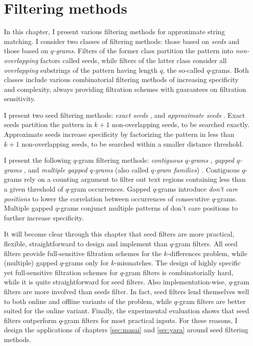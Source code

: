 \chapter{Filtering methods}
\label{sec:filter}

In this chapter, I present various filtering methods for approximate string matching.
I consider two classes of filtering methods: those based on \emph{seeds} and those based on \emph{$q$-grams}.
Filters of the former class partition the pattern into \emph{non-overlapping} factors called seeds, while filters of the latter class consider all \emph{overlapping} substrings of the pattern having length $q$, the so-called $q$-grams.
Both classes include various combinatorial filtering methods of increasing specificity and complexity, always providing filtration schemes with guarantees on filtration sensitivity.

I present two seed filtering methods:
\emph{exact seeds} \citep{Baeza1992}, and
\emph{approximate seeds} \citep{Myers1994,Navarro2000}.
Exact seeds partition the pattern in $k+1$ non-overlapping seeds, to be searched exactly.
Approximate seeds increase specificity by factorizing the pattern in less than $k+1$ non-overlapping seeds, to be searched within a smaller distance threshold.

I present the following $q$-gram filtering methods:
\emph{contiguous $q$-grams} \citep{Jokinen1991},
\emph{gapped $q$-grams} \citep{Burkhardt2001}, and
\emph{multiple gapped $q$-grams} (also called \emph{$q$-gram families}) \citep{Kucherov2005}.
Contiguous $q$-grams rely on a counting argument to filter out text regions containing less than a given threshold of $q$-gram occurrences.
Gapped $q$-grams introduce \emph{don't care positions} to lower the correlation between occurrences of consecutive $q$-grams.
Multiple gapped $q$-grams conjunct multiple patterns of don't care positions to further increase specificity.

It will become clear through this chapter that seed filters are more practical, flexible, straightforward to design and implement than $q$-gram filters.
All seed filters provide full-sensitive filtration schemes for the $k$-differences problem, while (multiple) gapped $q$-grams only for $k$-mismatches.
The design of highly specific yet full-sensitive filtration schemes for $q$-gram filters is combinatorially hard, while it is quite straightforward for seed filters.
Also implementation-wise, $q$-gram filters are more involved than seeds filter.
In fact, seed filters lend themselves well to both online and offline variants of the problem, while $q$-gram filters are better suited for the online variant.
Finally, the experimental evaluation shows that seed filters outperform $q$-gram filters for most practical inputs.
For these reasons, I design the applications of chapters \ref{sec:masai} and \ref{sec:yara} around seed filtering methods.


